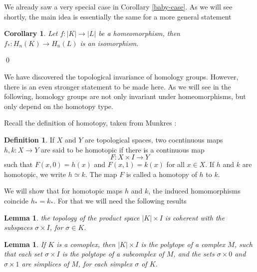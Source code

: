 \documentclass[draft,toc=bib]{scrartcl}
\theoremstyle{plain}
\newtheorem{lemma}[theorem]{Lemma}
\newtheorem{corollary}[theorem]{Corollary}
\theoremstyle{definition}
\newtheorem	{definition}[theorem]{Definition}
\theoremstyle{remark}
\begin{document}
We already saw a very special case in Corollary \ref{baby-case}. As we will see shortly, the main idea is essentially the same for a more general statement

\begin{corollary}
	Let $f: |K|\to |L| $ be a homeomorphism, then $f_\ast: H_n(K)\to H_n(L)$ is an isomorphism.
\end{corollary}\qed

We have discovered the topological invariance of homology groups. However, there is an even stronger statement to be made here. As we will see in the following, homology groups are not only invariant under homeomorphisms, but only depend on the homotopy type.

Recall the definition of homotopy, taken from Munkres \cite[p. 94]{mu}:

\begin{definition}
	If $X$ and $Y$ are topological spaces, two cocntinuous maps $h, k: X\to Y$ are said to be homotopic if there is a continuous map \[
	F: X\times I\to Y
	\]
	such that $F(x,0)=h(x)$ and $F(x,1)=k(x)$ for all $x\in X$. If $h$ and $k$ are homotopic, we write $h\simeq k$. The map $F$ is called a homotopy of $h$ to $k$. 
\end{definition}

We will show that for homotopic maps $h$ and $k$, the induced homomorphisms coincide $h_\ast=k_\ast$. For that we will need the following results

\begin{lemma}\label{coherent}%
	the topology of the product space $|K|\times I$ is coherent with the subspaces $\sigma\times I$, for $\sigma\in K$.
\end{lemma}

\begin{lemma}%
	If $K$ is a comoplex, then $|K|\times I$ is the polytope of a complex $M$, such that each set $\sigma\times I$ is the polytope of a subcomplex of $M$, and the sets $\sigma\times 0$ and $\sigma\times 1$ are simplices of $M$, for each simplex $\sigma$ of $K$.
\end{lemma}
\end{document}
